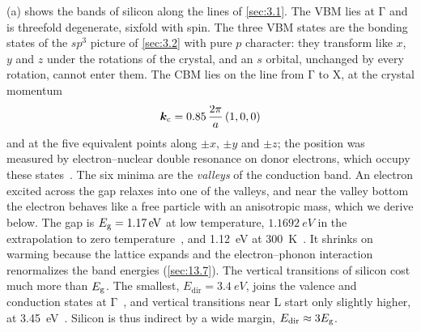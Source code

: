 (a) shows the bands of silicon along the lines of \cref{sec:3.1}. The VBM lies at $\mathrm{\Gamma}$ and is threefold degenerate, sixfold with spin. The three VBM states are the bonding states of the $sp^3$ picture of \cref{sec:3.2} with pure $p$ character: they transform like $x$, $y$ and $z$ under the rotations of the crystal, and an $s$ orbital, unchanged by every rotation, cannot enter them. The CBM lies on the line from $\mathrm{\Gamma}$ to $\mathrm{X}$, at the crystal momentum
\begin{equation}
  \bm{k}_{\mathrm{c}} = 0.85\,\frac{2\pi}{a}\,(1, 0, 0)
  \label{eq:3.3-kc}
\end{equation}
and at the five equivalent points along $\pm x$, $\pm y$ and $\pm z$; the position was measured by electron--nuclear double resonance on donor electrons, which occupy these states~\cite{feher1959electron}. The six minima are the \emph{valleys} of the conduction band. An electron excited across the gap relaxes into one of the valleys, and near the valley bottom the electron behaves like a free particle with an anisotropic mass, which we derive below. The gap is $E_{\mathrm{g}} = \SI{1.17}{eV}$ at low temperature, $\SI{1.1692}{eV}$ in the extrapolation to zero temperature~\cite[Eq.~(11)]{ramanathan2020ionization}, and \SI{1.12}{eV} at \SI{300}{K}~\cite[Table~I]{lucero2012improved}. It shrinks on warming because the lattice expands and the electron--phonon interaction renormalizes the band energies (\cref{sec:13.7}). The vertical transitions of silicon cost much more than $E_{\mathrm{g}}$. The smallest, $E_{\mathrm{dir}} = \SI{3.4}{eV}$, joins the valence and conduction states at $\mathrm{\Gamma}$~\cite[Table~II]{rideau2006strained}, and vertical transitions near $\mathrm{L}$ start only slightly higher, at \SI{3.45}{eV}~\cite[Table~VI]{rideau2006strained}. Silicon is thus indirect by a wide margin, $E_{\mathrm{dir}} \approx 3E_{\mathrm{g}}$.

